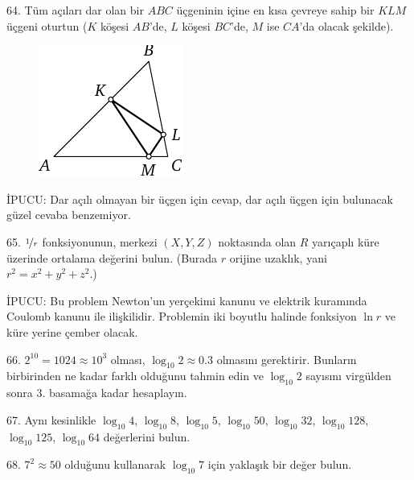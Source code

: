 \begin{problem}{64.}
	Tüm  açıları dar olan bir  $ABC$ üçgeninin içine en kısa çevreye sahip  bir  $KLM$ üçgeni oturtun	($K$ köşesi  $AB$'de, $L$ köşesi    $BC$'de, $M$  ise $CA$'da olacak şekilde).
	\begin{figure}
		\includegraphics{resources/taskbook-48}
	\end{figure}

	\begin{note}{{\. I}PUCU:}
		Dar açılı olmayan bir üçgen için cevap, dar açılı üçgen için bulunacak güzel cevaba benzemiyor. 
	\end{note}
\end{problem}

\begin{problem}{65.}
	$\nicefrac{1}{r}$ fonksiyonunun, merkezi $(X,Y,Z)$ noktasında olan $R$ yarıçaplı  küre üzerinde ortalama değerini  bulun. (Burada $r$ orijine uzaklık, yani $r^2=x^2+y^2+z^2$.)

	\begin{note}{{\. I}PUCU:}
		Bu problem Newton'un yerçekimi kanunu ve elektrik ku\-ra\-mın\-da Coulomb kanunu ile ilişkilidir. Problemin iki boyutlu halinde fonksiyon $\ln r$ ve küre yerine çember olacak.
	\end{note}
\end{problem}

\begin{problem}{66.}
	$2^{10}=1024 \approx 10^3$  olması,
	$\log_{10} 2 \approx 0.3$ olmasını gerektirir. Bunların birbirinden ne kadar farklı olduğunu tahmin edin ve $\log_{10} 2$ sayısını virgülden sonra 3. basamağa kadar hesaplayın.
\end{problem}

\begin{problem}{67.}
	Aynı kesinlikle $\log_{10} 4$, $\log_{10} 8$,
	$\log_{10} 5$, $\log_{10} 50$, $\log_{10} 32$, $\log_{10} 128$,
	$\log_{10} 125$, $\log_{10} 64$ değerlerini bulun.
\end{problem}

\begin{problem}{68.}
	$7^2 \approx 50$ olduğunu kullanarak  $\log_{10} 7$ için yaklaşık bir değer bulun.
\end{problem}

